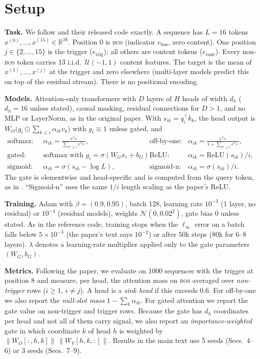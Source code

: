\documentclass{article} %
\newcommand{\bos}{\textsc{bos}}
\begin{document}
\section{Setup}
\label{sec:setup}
\textbf{Task.} We follow \citet{ranmilo2026sinks} and their released code exactly. A sequence has $L=16$
tokens $x^{(0)},\dots,x^{(15)}\in\mathbb{R}^{16}$. Position $0$ is \bos{} (indicator $e_\text{bos}$, zero
content). One position $j\in\{2,\dots,15\}$ is the trigger ($e_\text{trig}$); all others are content tokens
($e_\text{cont}$). Every non-\bos{} token carries 13 i.i.d.\ $\mathcal{U}(-1,1)$ content features. The
target is the mean of $x^{(1)},\dots,x^{(j)}$ at the trigger and zero elsewhere (multi-layer models predict
this on top of the residual stream). There is no positional encoding.

\textbf{Models.} Attention-only transformers with $D$ layers of $H$ heads of width $d_h$ ($d_h=16$ unless
stated), causal masking, residual connections for $D>1$, and no MLP or LayerNorm, as in the original paper.
With $s_{ik}=q_i^\top k_k$, the head output is $W_O\big(g_i\odot\sum_{k\le i}\alpha_{ik}v_k\big)$ with
$g_i\equiv 1$ unless gated, and
\begin{align*}
\text{softmax: }\; & \alpha_{ik}=\tfrac{e^{s_{ik}}}{\sum_{k'\le i}e^{s_{ik'}}}, &
\text{off-by-one: }\; & \alpha_{ik}=\tfrac{e^{s_{ik}}}{1+\sum_{k'\le i}e^{s_{ik'}}},\\
\text{gated: }\; & \text{softmax with } g_i=\sigma(W_G x_i+b_G), &
\text{ReLU: }\; & \alpha_{ik}=\mathrm{ReLU}(s_{ik})/i,\\
\text{sigmoid: }\; & \alpha_{ik}=\sigma(s_{ik}-\log L), &
\text{sigmoid-n: }\; & \alpha_{ik}=\sigma(s_{ik})/i.
\end{align*}
The gate is elementwise and head-specific and is computed from the query token, as in \citet{qiu2025gated}.
``Sigmoid-n'' uses the same $1/i$ length scaling as the paper's ReLU.

\textbf{Training.} Adam \citep{kingma2015adam} with $\beta=(0.9,0.95)$, batch 128, learning rate $10^{-3}$
(1 layer, no residual) or $10^{-4}$ (residual models), weights $\mathcal{N}(0,0.02^2)$, gate bias $0$
unless stated. As in the reference code, training stops when the $\ell_\infty$ error on a batch falls
below $5\times10^{-3}$ (the paper's text says $10^{-2}$) or after 50k steps (80k for 6--8 layers).
$\lambda$ denotes a learning-rate multiplier applied only to the gate parameters $(W_G,b_G)$.

\textbf{Metrics.} Following the paper, we evaluate on 1000 sequences with the trigger at position 8 and
measure, per head, the attention mass on \bos{} averaged over \emph{non-trigger} rows ($i\ge1$, $i\neq j$).
A head is a \emph{sink head} if this exceeds $0.6$. For off-by-one we also report the
\emph{null-slot mass} $1-\sum_k\alpha_{ik}$. For gated attention we report the gate value on non-trigger and
trigger rows. Because the gate has $d_h$ coordinates per head and not all of them carry signal, we also report
an \emph{importance-weighted} gate in which coordinate $k$ of head $h$ is weighted by
$\|W_O[:,h,k]\|\,\|W_V[h,k,:]\|$. Results in the main text use 5 seeds (Secs.~4--6) or 3 seeds (Secs.~7--9).
\end{document}
